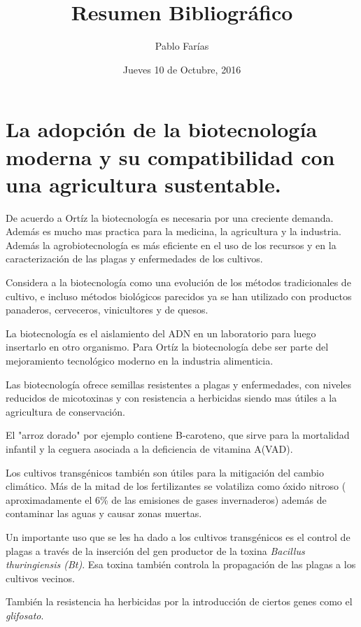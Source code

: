 \documentclass[11pt]{article}
\author{Pablo Farías}
\date{Jueves 10 de Octubre, 2016}
\title{Resumen Bibliográfico}
\begin{document}
\tableofcontents

\maketitle

\section{La adopción de la biotecnología moderna y su compatibilidad con una agricultura sustentable.}
\label{sec:orgheadline1}

De acuerdo a Ortíz \cite{ortiz-2012-la-de} la biotecnología es necesaria por una creciente demanda. Además es mucho mas practica para la medicina, la agricultura y la industria. Además la agrobiotecnología es más eficiente en el uso de los recursos y en la caracterización de las plagas y enfermedades de los cultivos.

Considera a la biotecnología como una evolución de los métodos tradicionales de cultivo, e incluso métodos biológicos parecidos ya se han utilizado con productos panaderos, cerveceros, vinicultores y de quesos.

La biotecnología es el aislamiento del ADN en un laboratorio para luego insertarlo en otro organismo. Para Ortíz la biotecnología debe ser parte del mejoramiento tecnológico moderno en la industria alimenticia.

Las biotecnología ofrece semillas resistentes a plagas y enfermedades, con niveles reducidos de micotoxinas y con resistencia a herbicidas siendo mas útiles a la agricultura de conservación. 

El "arroz dorado" por ejemplo contiene B-caroteno, que sirve para la mortalidad infantil y la ceguera asociada a la deficiencia de vitamina A(VAD).

Los cultivos transgénicos también son útiles para la mitigación del cambio climático. Más de la mitad de los fertilizantes se volatiliza como óxido nitroso ( aproximadamente el 6\% de las emisiones de gases invernaderos) además de contaminar las aguas y causar zonas muertas.

Un importante uso que se les ha dado a los cultivos transgénicos es el control de plagas a través  de la inserción del gen productor de la toxina \emph{Bacillus thuringiensis (Bt)}.  Esa toxina también controla la propagación de las plagas a los cultivos vecinos. 

También la resistencia ha herbicidas por la introducción de ciertos genes como el \emph{glifosato}.
\end{document}
